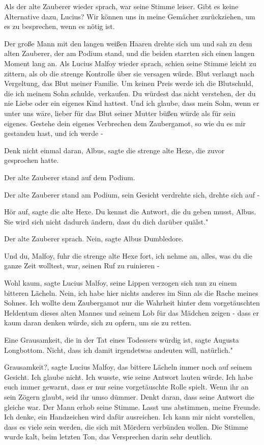 Als der alte Zauberer wieder sprach, war seine Stimme leiser. \glqq Gibt es
keine Alternative dazu, Lucius? Wir können uns in meine Gemächer zurückziehen,
um es zu besprechen, wenn es nötig ist.\grqq{}

Der große Mann mit den langen weißen Haaren drehte sich um und sah zu dem alten
Zauberer, der am Podium stand, und die beiden starrten sich einen langen Moment
lang an. Als Lucius Malfoy wieder sprach, schien seine Stimme leicht zu zittern,
als ob die strenge Kontrolle über sie versagen würde. \glqq Blut verlangt nach
Vergeltung, das Blut meiner Familie. Um keinen Preis werde ich die Blutschuld,
die ich meinem Sohn schulde, verkaufen. Du würdest das nicht verstehen, der du
nie Liebe oder ein eigenes Kind hattest. Und ich glaube, dass mein Sohn, wenn er
unter uns wäre, lieber für das Blut seiner Mutter büßen würde als für sein
eigenes. Gestehe dein eigenes Verbrechen dem Zaubergamot, so wie du es mir
gestanden hast, und ich werde -\grqq{}

\glqq Denk nicht einmal daran, Albus\grqq{}, sagte die strenge alte Hexe, die
zuvor gesprochen hatte.

Der alte Zauberer stand auf dem Podium.

Der alte Zauberer stand am Podium, sein Gesicht verdrehte sich, drehte sich auf
-

\glqq Hör auf\grqq{}, sagte die alte Hexe. \glqq Du kennst die Antwort, die du
geben musst, Albus. Sie wird sich nicht dadurch ändern, dass du dich darüber
quälst."

Der alte Zauberer sprach. \glqq Nein\grqq{}, sagte Albus Dumbledore.

\glqq Und du, Malfoy\grqq{}, fuhr die strenge alte Hexe fort, \glqq ich nehme
an, alles, was du die ganze Zeit wolltest, war, seinen Ruf zu ruinieren -\grqq{}

\glqq Wohl kaum\grqq{}, sagte Lucius Malfoy, seine Lippen verzogen sich nun zu
einem bitteren Lächeln. \glqq Nein, ich habe hier nichts anderes im Sinn als die
Rache meines Sohnes. Ich wollte dem Zaubergamot nur die Wahrheit hinter dem
vorgetäuschten Heldentum dieses alten Mannes und seinem Lob für das Mädchen
zeigen - dass er kaum daran denken würde, sich zu opfern, um sie zu
retten.\grqq{}

\glqq Eine Grausamkeit, die in der Tat eines Todessers würdig ist\grqq{}, sagte
Augusta Longbottom. \glqq Nicht, dass ich damit irgendetwas andeuten will,
natürlich."

\glqq Grausamkeit?\grqq{}, sagte Lucius Malfoy, das bittere Lächeln immer noch
auf seinem Gesicht. \glqq Ich glaube nicht. Ich wusste, wie seine Antwort lauten
würde. Ich habe euch immer gewarnt, dass er nur seine vorgetäuschte Rolle
spielt. Wenn ihr an sein Zögern glaubt, seid ihr umso dümmer. Denkt daran, dass
seine Antwort die gleiche war.\grqq{} Der Mann erhob seine Stimme. \glqq Lasst
uns abstimmen, meine Freunde. Ich denke, ein Handzeichen wird dafür ausreichen.
Ich kann mir nicht vorstellen, dass es viele sein werden, die sich mit Mördern
verbünden wollen.\grqq{} Die Stimme wurde kalt, beim letzten Ton, das
Versprechen darin sehr deutlich.

